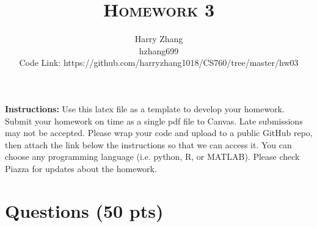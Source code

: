 \documentclass[a4paper]{article}
\title{\textsc{Homework 3}} %
\author{
Harry Zhang\\
hzhang699\\
Code Link: https://github.com/harryzhang1018/CS760/tree/master/hw03
}
\date{}
\theoremstyle{definition}
\begin{document}
\maketitle 


\textbf{Instructions:} 
Use this latex file as a template to develop your homework. Submit your homework on time as a single pdf file to Canvas. Late submissions may not be accepted. Please wrap your code and upload to a public GitHub repo, then attach the link below the instructions so that we can access it. You can choose any programming language (i.e. python, R, or MATLAB). Please check Piazza for updates about the homework.

\section{Questions (50 pts)}
\end{document}
